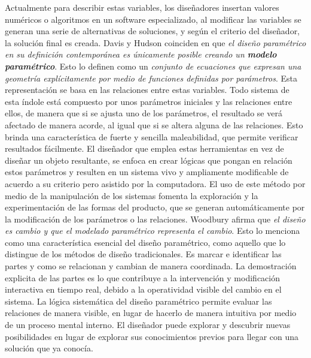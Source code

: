  Actualmente para describir estas variables, los diseñadores
insertan valores numéricos o algoritmos en un software especializado, al modificar las
variables se generan una serie de alternativas de soluciones, y según el criterio del diseñador, la solución final es creada. Davis y Hudson \citep{Kaled2016} coinciden en que \textit{el diseño paramétrico en su definición contemporánea es únicamente posible creando un \textbf{modelo paramétrico}}. Esto lo definen como un \textit{conjunto de ecuaciones que expresan una geometría explícitamente por medio de funciones definidas por parámetros}. Esta representación se basa en las relaciones entre estas variables. Todo sistema de esta índole está compuesto por unos parámetros iniciales y las relaciones entre ellos, de manera que si se ajusta uno de los parámetros, el resultado se verá afectado de manera acorde, al igual que si se altera alguna de las relaciones. Esto brinda una característica de fuerte y sencilla maleabilidad, que permite verificar resultados fácilmente. El diseñador que emplea estas herramientas en vez de diseñar un objeto resultante, se enfoca en crear lógicas que pongan en relación estos parámetros y resulten en un sistema vivo y ampliamente modificable de acuerdo a su criterio pero asistido por la computadora. El uso de este método por medio de la manipulación de los sistemas fomenta la exploración y la experimentación de las formas del producto, que se generan automáticamente por la modificación de los parámetros o las relaciones. Woodbury \citep{Kaled2016} afirma que \textit{el diseño es cambio y que el modelado paramétrico representa el cambio}. Esto lo menciona como una característica esencial del diseño paramétrico, como aquello que lo distingue de los métodos de diseño tradicionales. Es marcar e identificar las partes y como se relacionan y cambian de manera coordinada. La demostración explicita de las partes es lo que contribuye a la intervención y modificación interactiva en tiempo real, debido a la operatividad visible del cambio en el sistema. La lógica sistemática del diseño paramétrico permite evaluar las relaciones de manera visible, en lugar de hacerlo de manera intuitiva por medio de un proceso mental interno.
El diseñador puede explorar y descubrir nuevas posibilidades en lugar de explorar sus conocimientos previos para llegar con una solución que ya conocía.
